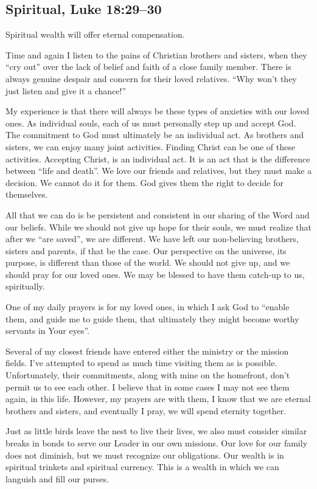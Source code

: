 \documentclass[12pt]{memoir}
\begin{document}
\subsection{Spiritual, Luke 18:29--30}

Spiritual wealth will offer eternal compensation. 

Time and again I listen to the pains of Christian brothers and sisters,
when they ``cry out'' over the lack of belief and faith of a close
family member. There is always genuine despair and concern for their
loved relatives. ``Why won't they just listen and give it a chance!'' 

My experience is that there will always be these types of anxieties
with our loved ones. As individual souls, each of us must personally
step up and accept God. The commitment to God must ultimately be an
individual act. As brothers and sisters, we can enjoy many joint activities.
Finding Christ can be one of these activities. Accepting Christ, is
an individual act. It is an act that is the difference between ``life
and death''. We love our friends and relatives, but they must make
a decision. We cannot do it for them. God gives them the right to
decide for themselves. 

All that we can do is be persistent and consistent in our sharing
of the Word and our beliefs. While we should not give up hope for
their souls, we must realize that after we ``are saved'', we are
different. We have left our non-believing brothers, sisters and parents,
if that be the case. Our perspective on the universe, its purpose,
is different than those of the world. We should not give up, and we
should pray for our loved ones. We may be blessed to have them catch-up
to us, spiritually. 

One of my daily prayers is for my loved ones, in which I ask God to
``enable them, and guide me to guide them, that ultimately they might
become worthy servants in Your eyes''. 

Several of my closest friends have entered either the ministry or
the mission fields. I've attempted to spend as much time visiting
them as is possible. Unfortunately, their commitments, along with
mine on the homefront, don't permit us to see each other. I believe
that in some cases I may not see them again, in this life. However,
my prayers are with them, I know that we are eternal brothers and
sisters, and eventually I pray, we will spend eternity together. 

Just as little birds leave the nest to live their lives, we also must
consider similar breaks in bonds to serve our Leader in our own missions.
Our love for our family does not diminish, but we must recognize our
obligations. Our wealth is in spiritual trinkets and spiritual currency.
This is a wealth in which we can languish and fill our purses. 
\end{document}
